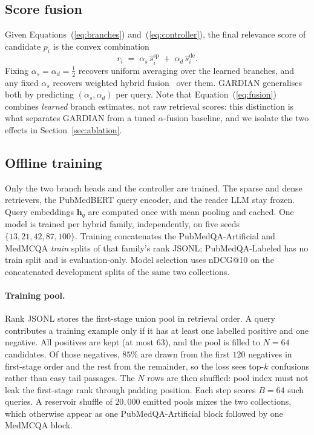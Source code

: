\subsection{Score fusion}
\label{sec:fusion}

Given Equations~(\ref{eq:branches}) and~(\ref{eq:controller}), the final
relevance score of candidate $p_i$ is the convex combination
%
\begin{equation}
  r_i
  \;=\;
  \alpha_s\,\hat{s}_i^{\mathrm{sp}}
  \;+\;
  \alpha_d\,\hat{s}_i^{\mathrm{de}}.
  \label{eq:fusion}
\end{equation}
%
Fixing $\alpha_s=\alpha_d=\tfrac{1}{2}$ recovers uniform averaging over the
learned branches, and any fixed $\alpha_s$ recovers weighted hybrid
fusion~\cite{cormack2009rrf} over them. GARDIAN generalises both by predicting
$(\alpha_s,\alpha_d)$ per query. Note that Equation~(\ref{eq:fusion}) combines
\emph{learned} branch estimates, not raw retrieval scores: this distinction is
what separates GARDIAN from a tuned $\alpha$-fusion baseline, and we isolate
the two effects in Section~\ref{sec:ablation}.

\subsection{Offline training}
\label{sec:offline}

Only the two branch heads and the controller are trained. The sparse and dense
retrievers, the PubMedBERT query encoder, and the reader LLM stay frozen.
Query embeddings $\mathbf{h}_q$ are computed once with mean pooling and cached.
One model is trained per hybrid family, independently, on five seeds
$\{13,21,42,87,100\}$. Training concatenates the PubMedQA-Artificial and
MedMCQA \emph{train} splits of that family's rank JSONL; PubMedQA-Labeled has
no train split and is evaluation-only. Model selection uses nDCG@10 on the
concatenated development splits of the same two collections.

\paragraph{Training pool.}
Rank JSONL stores the first-stage union pool in retrieval order. A query
contributes a training example only if it has at least one labelled positive
and one negative. All positives are kept (at most $63$), and the pool is
filled to $N{=}64$ candidates. Of those negatives, $85\%$ are drawn from the
first $120$ negatives in first-stage order and the rest from the remainder, so
the loss sees top-$k$ confusions rather than easy tail passages. The $N$ rows
are then shuffled: pool index must not leak the first-stage rank through
padding position. Each step scores $B{=}64$ such queries. A reservoir shuffle
of $20{,}000$ emitted pools mixes the two collections, which otherwise appear
as one PubMedQA-Artificial block followed by one MedMCQA block.

